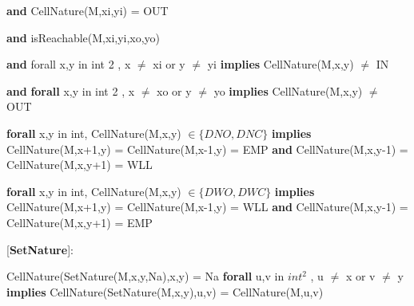 \documentclass[11pt]{article}
\begin{document}
\textbf{and} CellNature(M,xi,yi) = OUT

\textbf{and} isReachable(M,xi,yi,xo,yo)

\textbf{and} forall x,y in int 2 , x $\neq$ xi or y $\neq$ yi \textbf{implies} CellNature(M,x,y) $\neq$ IN

\textbf{and} \textbf{forall} x,y in int 2 , x $\neq$ xo or y $\neq$ yo \textbf{implies} CellNature(M,x,y) $\neq$ OUT

\textbf{forall} x,y in int, CellNature(M,x,y) $\in \{ DNO, DNC\}$ \textbf{implies} CellNature(M,x+1,y) = CellNature(M,x-1,y) = EMP \textbf{and} CellNature(M,x,y-1) = CellNature(M,x,y+1) = WLL

\textbf{forall} x,y in int, CellNature(M,x,y) $\in \{ DWO, DWC\}$ \textbf{implies} CellNature(M,x+1,y) = CellNature(M,x-1,y) = WLL \textbf{and} CellNature(M,x,y-1) = CellNature(M,x,y+1) = EMP

[\textbf{SetNature}]:

CellNature(SetNature(M,x,y,Na),x,y) = Na \textbf{forall} u,v in $int^2$ , u $\neq$ x or v $\neq$ y \textbf{implies} CellNature(SetNature(M,x,y),u,v) = CellNature(M,u,v)
\end{document}
